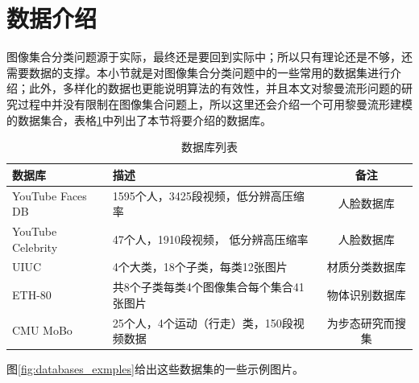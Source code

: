 \section{数据介绍}
\label{sec:data_intro}
图像集合分类问题源于实际，最终还是要回到实际中；所以只有理论还是不够，还需要数据的支撑。本小节就是对图像集合分类问题中的一些常用的数据集进行介绍；此外，多样化的数据也更能说明算法的有效性，并且本文对黎曼流形问题的研究过程中并没有限制在图像集合问题上，所以这里还会介绍一个可用黎曼流形建模的数据集合，表格\ref{tab:database_list}中列出了本节将要介绍的数据库。
\begin{table}[htb]
	\centering
	\caption{数据库列表}
	\begin{tabular}{l|l|c}
	\toprule[1.5pt]
		{\heiti 数据库} &{\heiti 描述} &{\heiti 备注} \\ \hline
		YouTube Faces DB\cite{Database_YTF} &1595个人，3425段视频，低分辨高压缩率 &人脸数据库 \\ \hline
		YouTube Celebrity\cite{Database_YTC} &47个人，1910段视频， 低分辨高压缩率 &人脸数据库 \\ \hline
		UIUC\cite{Database_UIUC} &4个大类，18个子类，每类12张图片 &材质分类数据库 \\ \hline
		ETH-80\cite{Database_ETH80}   &共8个子类每类4个图像集合每个集合41张图片 &物体识别数据库 \\ \hline
		CMU MoBo\cite{Database_MoBo} &25个人，4个运动（行走）类，150段视频数据 &为步态研究而搜集 \\
	\bottomrule[1.5pt]
	\end{tabular}
	\label{tab:database_list}
\end{table}
图\ref{fig:databases_exmples}给出这些数据集的一些示例图片。
